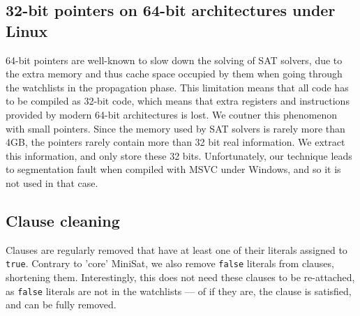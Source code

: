 \documentclass[final]{ieee}
\begin{document}
\subsection{32-bit pointers on 64-bit architectures under Linux}
64-bit pointers are well-known to slow down the solving of SAT solvers, due to the extra memory and thus cache space occupied by them when going through the watchlists in the propagation phase. This limitation means that all code has to be compiled as 32-bit code, which means that extra registers and instructions provided by modern 64-bit architectures is lost. We coutner this phenomenon with small pointers. Since the memory used by SAT solvers is rarely more than 4GB, the pointers rarely contain more than 32 bit real information. We extract this information, and only store these 32 bits. Unfortunately, our technique leads to segmentation fault when compiled with MSVC under Windows, and so it is not used in that case.


\subsection{Clause cleaning}
Clauses are regularly removed that have at least one of their literals assigned to \texttt{true}. Contrary to 'core' MiniSat, we also remove \texttt{false} literals from clauses, shortening them. Interestingly, this does not need these clauses to be re-attached, as \texttt{false} literals are not in the watchlists --- of if they are, the clause is satisfied, and can be fully removed.

\end{document}

